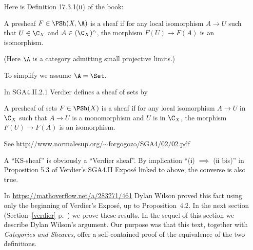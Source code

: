 \documentclass[12pt]{article}
\theoremstyle{remark}
\theoremstyle{definition}
\begin{document}


Here is Definition 17.3.1(ii) of the book: 

\begin{df}\label{sheaf}
A presheaf $F\in\PSh(X,\A)$ is a sheaf if for any local isomorphism $A\to U$ such that $U\in\C_X$ and $A\in(\C_X)^\wedge$, the morphism $F(U)\to F(A)$ is an isomorphism.
\end{df}

(Here $\A$ is a category admitting small projective limits.)

To simplify we assume $\A=\Set$.

In SGA4.II.2.1 Verdier defines a sheaf of sets by 

\begin{df}\label{faisceau}
A presheaf of sets $F\in\PSh(X)$ is a sheaf if for any local isomorphism $A\to U$ in $\C_X$ such that $A\to U$ is a monomorphism and $U$ is in $\C_X$, the morphism $F(U)\to F(A)$ is an isomorphism. 
\end{df} 

See \href{http://www.normalesup.org/~forgogozo/SGA4/02/02.pdf}{http://www.normalesup.org/$\sim$forgogozo/SGA4/02/02.pdf}

A ``KS-sheaf'' is obviously a ``Verdier sheaf''. By implication ``(i) $\implies$ (ii bis)'' in Proposition 5.3 of Verdier's SGA4.II Exposé linked to above, the converse is also true. %

In \href{https://mathoverflow.net/a/283271/461}{https://mathoverflow.net/a/283271/461} Dylan Wilson proved this fact using only the beginning of Verdier's Exposé, up to Proposition~4.2. In the next section (Section~\ref{verdier} p.~\pageref{verdier}) we prove these results. In the sequel of this section we describe Dylan Wilson's argument. Our purpose was that this text, together with \emph{Categories and Sheaves}, offer a self-contained proof of the equivalence of the two definitions.
\end{document}

